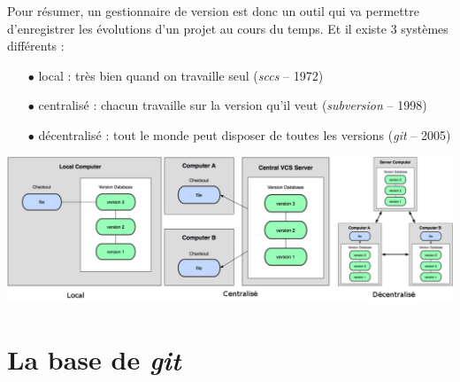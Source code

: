 \documentclass[12pt,a4paper]{article}
\begin{document}
Pour résumer, un gestionnaire de version est donc un outil qui va permettre d'enregistrer les évolutions d'un projet au cours du temps. Et il existe 3 systèmes différents :
\begin{itemize}
\item[$\bullet$] local : très bien quand on travaille seul (\emph{sccs} -- 1972) 
\item[$\bullet$] centralisé : chacun travaille sur la version qu'il veut (\emph{subversion} -- 1998)
\item[$\bullet$] décentralisé : tout le monde peut disposer de toutes les versions (\emph{git} -- 2005)
\end{itemize}

\begin{center}
\includegraphics[width=0.9\linewidth]{gest}
\end{center}



\section{La base de \emph{git}}
\end{document}
